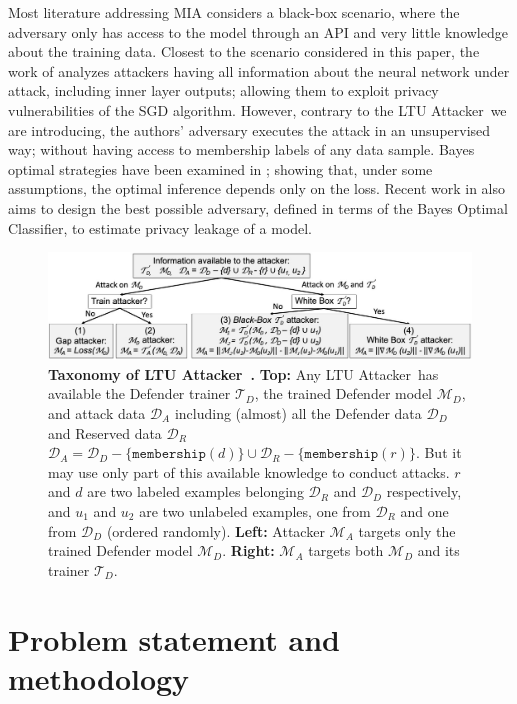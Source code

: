 \documentclass[letterpaper]{article}
\newcommand{\sminus}{-}
\newcommand{\oracle}{LTU Attacker~}
\begin{document}
Most literature addressing MIA considers a black-box scenario, where the adversary only has access to the model through an API and very little knowledge about the training data. Closest to the scenario considered in this paper, the work of \cite{nasr2019comprehensive} analyzes attackers having all information about the neural network under attack, including inner layer outputs; allowing them to exploit privacy vulnerabilities of the SGD algorithm. However, contrary to the \oracle we are introducing, the authors' adversary executes the attack in an unsupervised way; without having access to  membership labels of any data sample. Bayes optimal strategies have been examined in \cite{sablayrolles2019white}; showing that, under some assumptions, the optimal inference depends only on the loss. Recent work in \cite{liu2020mace} also aims to design the best possible adversary, defined in terms of the Bayes Optimal Classifier, to estimate privacy leakage of a model.


\begin{figure}[t]
\centering
\includegraphics[width=\textwidth]{Figures/Taxonomy.jpg}
\caption{\label{fig:taxonomy} {\bf Taxonomy of \oracle.} {\bf Top:} Any \oracle has available the Defender trainer $\mathcal{T}_D$, the trained Defender model $\mathcal{M}_D$, and attack data $\mathcal{D}_A$ including (almost) all the Defender data $\mathcal{D}_D$ and Reserved data $\mathcal{D}_R$ $\mathcal{D}_A=\mathcal{D}_D\sminus\{\texttt{membership}(d)\} \cup \mathcal{D}_R\sminus\{\texttt{membership}(r)\}$. But it may use only part of this available knowledge to conduct attacks. $r$ and $d$ are two labeled examples belonging $\mathcal{D}_R$  and $\mathcal{D}_D$ respectively, and $u_1$ and $u_2$ are two unlabeled examples, one from $\mathcal{D}_R$ and one from $\mathcal{D}_D$ (ordered randomly). {\bf Left:} Attacker $\mathcal{M}_A$ targets only the trained Defender model $\mathcal{M}_D$. {\bf Right:} $\mathcal{M}_A$ targets both $\mathcal{M}_D$ and its trainer $\mathcal{T}_D$.}
\end{figure}



\section{Problem statement and methodology}
\end{document}
